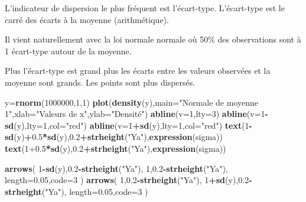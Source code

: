 \documentclass[
]{book}
\newenvironment{Shaded}{\begin{snugshade}}{\end{snugshade}}
\newcommand{\AttributeTok}[1]{\textcolor[rgb]{0.13,0.29,0.53}{#1}}
\newcommand{\DecValTok}[1]{\textcolor[rgb]{0.00,0.00,0.81}{#1}}
\newcommand{\FloatTok}[1]{\textcolor[rgb]{0.00,0.00,0.81}{#1}}
\newcommand{\FunctionTok}[1]{\textcolor[rgb]{0.13,0.29,0.53}{\textbf{#1}}}
\newcommand{\NormalTok}[1]{#1}
\newcommand{\OtherTok}[1]{\textcolor[rgb]{0.56,0.35,0.01}{#1}}
\newcommand{\SpecialCharTok}[1]{\textcolor[rgb]{0.81,0.36,0.00}{\textbf{#1}}}
\newcommand{\StringTok}[1]{\textcolor[rgb]{0.31,0.60,0.02}{#1}}
\begin{document}
L'indicateur de dispersion le plus fréquent est l'écart-type. L'écart-type est
le carré des écarts à la moyenne (arithmétique).

Il vient naturellement avec la loi normale normale où 50\% des observations sont
à 1 écart-type autour de la moyenne.

Plus l'écart-type est grand plus les écarts entre les valeurs observées et la moyenne
sont grands. Les points sont plus dispersés.

\begin{Shaded}
\begin{Highlighting}[]
\NormalTok{y}\OtherTok{=}\FunctionTok{rnorm}\NormalTok{(}\DecValTok{1000000}\NormalTok{,}\DecValTok{1}\NormalTok{,}\DecValTok{1}\NormalTok{)}
\FunctionTok{plot}\NormalTok{(}\FunctionTok{density}\NormalTok{(y),}\AttributeTok{main=}\StringTok{"Normale de moyenne 1"}\NormalTok{,}\AttributeTok{xlab=}\StringTok{"Valeurs de x"}\NormalTok{,}\AttributeTok{ylab=}\StringTok{"Densité"}\NormalTok{)}
\FunctionTok{abline}\NormalTok{(}\AttributeTok{v=}\DecValTok{1}\NormalTok{,}\AttributeTok{lty=}\DecValTok{3}\NormalTok{)}
\FunctionTok{abline}\NormalTok{(}\AttributeTok{v=}\DecValTok{1}\SpecialCharTok{{-}}\FunctionTok{sd}\NormalTok{(y),}\AttributeTok{lty=}\DecValTok{1}\NormalTok{,}\AttributeTok{col=}\StringTok{"red"}\NormalTok{)}
\FunctionTok{abline}\NormalTok{(}\AttributeTok{v=}\DecValTok{1}\SpecialCharTok{+}\FunctionTok{sd}\NormalTok{(y),}\AttributeTok{lty=}\DecValTok{1}\NormalTok{,}\AttributeTok{col=}\StringTok{"red"}\NormalTok{)}
\FunctionTok{text}\NormalTok{(}\DecValTok{1}\SpecialCharTok{{-}}\FunctionTok{sd}\NormalTok{(y)}\SpecialCharTok{+}\FloatTok{0.5}\SpecialCharTok{*}\FunctionTok{sd}\NormalTok{(y),}\FloatTok{0.2}\SpecialCharTok{+}\FunctionTok{strheight}\NormalTok{(}\StringTok{"Ya"}\NormalTok{),}\FunctionTok{expression}\NormalTok{(sigma))}
\FunctionTok{text}\NormalTok{(}\DecValTok{1}\FloatTok{+0.5}\SpecialCharTok{*}\FunctionTok{sd}\NormalTok{(y),}\FloatTok{0.2}\SpecialCharTok{+}\FunctionTok{strheight}\NormalTok{(}\StringTok{"Ya"}\NormalTok{),}\FunctionTok{expression}\NormalTok{(sigma))}

\FunctionTok{arrows}\NormalTok{(}
  \DecValTok{1}\SpecialCharTok{{-}}\FunctionTok{sd}\NormalTok{(y),}\FloatTok{0.2}\SpecialCharTok{{-}}\FunctionTok{strheight}\NormalTok{(}\StringTok{"Ya"}\NormalTok{),}
  \DecValTok{1}\NormalTok{,}\FloatTok{0.2}\SpecialCharTok{{-}}\FunctionTok{strheight}\NormalTok{(}\StringTok{"Ya"}\NormalTok{),}
  \AttributeTok{length=}\FloatTok{0.05}\NormalTok{,}\AttributeTok{code=}\DecValTok{3}
\NormalTok{)}
\FunctionTok{arrows}\NormalTok{(}
  \DecValTok{1}\NormalTok{,}\FloatTok{0.2}\SpecialCharTok{{-}}\FunctionTok{strheight}\NormalTok{(}\StringTok{"Ya"}\NormalTok{),}
  \DecValTok{1}\SpecialCharTok{+}\FunctionTok{sd}\NormalTok{(y),}\FloatTok{0.2}\SpecialCharTok{{-}}\FunctionTok{strheight}\NormalTok{(}\StringTok{"Ya"}\NormalTok{),}
  \AttributeTok{length=}\FloatTok{0.05}\NormalTok{,}\AttributeTok{code=}\DecValTok{3}
\NormalTok{)}
\end{Highlighting}
\end{Shaded}
\end{document}

